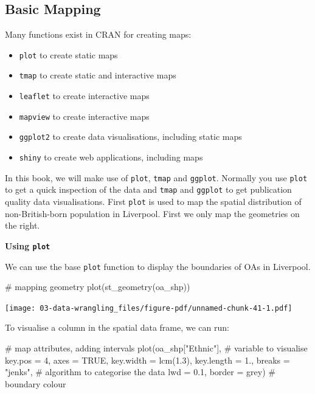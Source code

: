 \documentclass[
  letterpaper,
  DIV=11,
  numbers=noendperiod,
  oneside]{scrreprt}
\newenvironment{Shaded}{\begin{snugshade}}{\end{snugshade}}
\newcommand{\AttributeTok}[1]{\textcolor[rgb]{0.40,0.45,0.13}{#1}}
\newcommand{\CommentTok}[1]{\textcolor[rgb]{0.37,0.37,0.37}{#1}}
\newcommand{\ConstantTok}[1]{\textcolor[rgb]{0.56,0.35,0.01}{#1}}
\newcommand{\DecValTok}[1]{\textcolor[rgb]{0.68,0.00,0.00}{#1}}
\newcommand{\FloatTok}[1]{\textcolor[rgb]{0.68,0.00,0.00}{#1}}
\newcommand{\FunctionTok}[1]{\textcolor[rgb]{0.28,0.35,0.67}{#1}}
\newcommand{\NormalTok}[1]{\textcolor[rgb]{0.00,0.23,0.31}{#1}}
\newcommand{\StringTok}[1]{\textcolor[rgb]{0.13,0.47,0.30}{#1}}
\providecommand{\tightlist}{%
  \setlength{\itemsep}{0pt}\setlength{\parskip}{0pt}}\usepackage{longtable,booktabs,array}
\begin{document}
\subsection{Basic Mapping}\label{basic-mapping}

Many functions exist in CRAN for creating maps:

\begin{itemize}
\tightlist
\item
  \texttt{plot} to create static maps
\item
  \texttt{tmap} to create static and interactive maps
\item
  \texttt{leaflet} to create interactive maps
\item
  \texttt{mapview} to create interactive maps
\item
  \texttt{ggplot2} to create data visualisations, including static maps
\item
  \texttt{shiny} to create web applications, including maps
\end{itemize}

In this book, we will make use of \texttt{plot}, \texttt{tmap} and
\texttt{ggplot}. Normally you use \texttt{plot} to get a quick
inspection of the data and \texttt{tmap} and \texttt{ggplot} to get
publication quality data visualisations. First \texttt{plot} is used to
map the spatial distribution of non-British-born population in
Liverpool. First we only map the geometries on the right.

\textbf{Using \texttt{plot}}

We can use the base \texttt{plot} function to display the boundaries of
OAs in Liverpool.

\begin{Shaded}
\begin{Highlighting}[]
\CommentTok{\# mapping geometry}
\FunctionTok{plot}\NormalTok{(}\FunctionTok{st\_geometry}\NormalTok{(oa\_shp))}
\end{Highlighting}
\end{Shaded}

\texttt{[image: 03-data-wrangling\_files/figure-pdf/unnamed-chunk-41-1.pdf]}

To visualise a column in the spatial data frame, we can run:

\begin{Shaded}
\begin{Highlighting}[]
\CommentTok{\# map attributes, adding intervals}
\FunctionTok{plot}\NormalTok{(oa\_shp[}\StringTok{"Ethnic"}\NormalTok{], }\CommentTok{\# variable to visualise}
     \AttributeTok{key.pos =} \DecValTok{4}\NormalTok{, }
     \AttributeTok{axes =} \ConstantTok{TRUE}\NormalTok{, }
     \AttributeTok{key.width =} \FunctionTok{lcm}\NormalTok{(}\FloatTok{1.3}\NormalTok{), }
     \AttributeTok{key.length =} \FloatTok{1.}\NormalTok{,}
     \AttributeTok{breaks =} \StringTok{"jenks"}\NormalTok{, }\CommentTok{\# algorithm to categorise the data}
     \AttributeTok{lwd =} \FloatTok{0.1}\NormalTok{, }
     \AttributeTok{border =} \StringTok{\textquotesingle{}grey\textquotesingle{}}\NormalTok{) }\CommentTok{\# boundary colour}
\end{Highlighting}
\end{Shaded}
\end{document}
